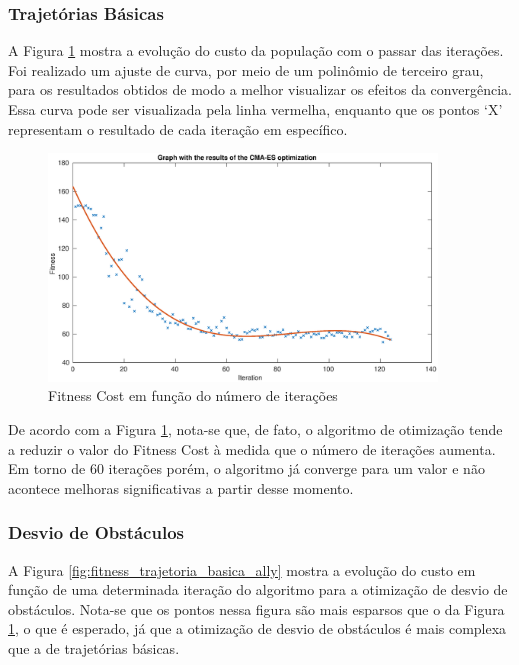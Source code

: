 \documentclass[10pt,fleqn,a4paper]{article}
\begin{document}
\subsubsection{Trajetórias Básicas}

A Figura \ref{fig:fitness_trajetoria_basica} mostra a evolução do custo da população com o passar das iterações. Foi realizado um ajuste de curva, por meio de um polinômio de terceiro grau, para os resultados obtidos de modo a melhor visualizar os efeitos da convergência. Essa curva pode ser visualizada pela linha vermelha, enquanto que os pontos `X’ representam o resultado de cada iteração em específico.

\begin{figure}[H]
	\centering
	\includegraphics[width=0.92\textwidth]{figures/CMA-ES_Fitness_Results.eps}
	\caption{Fitness Cost em função do número de iterações}
	\label{fig:fitness_trajetoria_basica}
\end{figure}

De acordo com a Figura \ref{fig:fitness_trajetoria_basica}, nota-se que, de fato, o algoritmo de otimização tende a reduzir o valor do Fitness Cost à medida que o número de iterações aumenta. Em torno de 60 iterações porém, o algoritmo já converge para um valor e não acontece melhoras significativas a partir desse momento.

\subsubsection{Desvio de Obstáculos}

A Figura \ref{fig:fitness_trajetoria_basica_ally} mostra a evolução do custo em função de uma determinada iteração do algoritmo para a otimização de desvio de obstáculos. Nota-se que os pontos nessa figura são mais esparsos que o da Figura \ref{fig:fitness_trajetoria_basica}, o que é esperado, já que a otimização de desvio de obstáculos é mais complexa que a de trajetórias básicas.
\end{document}
